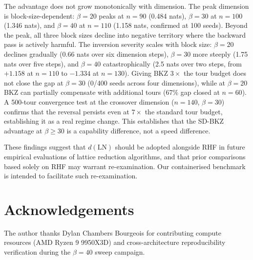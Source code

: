 \documentclass[journal=cic,version=preprint]{iacrj}
\begin{document}
The advantage does not grow monotonically with dimension. The peak dimension is block-size-dependent: $\beta=20$ peaks at $n=90$ (0.484 nats), $\beta=30$ at $n=100$ (1.346 nats), and $\beta=40$ at $n=110$ (1.158 nats, confirmed at 100 seeds). Beyond the peak, all three block sizes decline into negative territory where the backward pass is actively harmful. The inversion severity scales with block size: $\beta=20$ declines gradually (0.66 nats over six dimension steps), $\beta=30$ more steeply (1.75 nats over five steps), and $\beta=40$ catastrophically (2.5 nats over two steps, from $+1.158$ at $n=110$ to $-1.334$ at $n=130$). Giving BKZ $3\times$ the tour budget does not close the gap at $\beta=30$ (0/400 seeds across four dimensions), while at $\beta=20$ BKZ can partially compensate with additional tours (67\% gap closed at $n=60$). A 500-tour convergence test at the crossover dimension ($n=140$, $\beta=30$) confirms that the reversal persists even at $7\times$ the standard tour budget, establishing it as a real regime change. This establishes that the SD-BKZ advantage at $\beta\geq 30$ is a capability difference, not a speed difference.

These findings suggest that $d(\mathrm{LN})$ should be adopted alongside RHF in future empirical evaluations of lattice reduction algorithms, and that prior comparisons based solely on RHF may warrant re-examination. Our containerised benchmark is intended to facilitate such re-examination.

\section*{Acknowledgements}

The author thanks Dylan Chambers Bourgeois for contributing compute resources (AMD Ryzen 9 9950X3D) and cross-architecture reproducibility verification during the $\beta=40$ sweep campaign.


\end{document}
